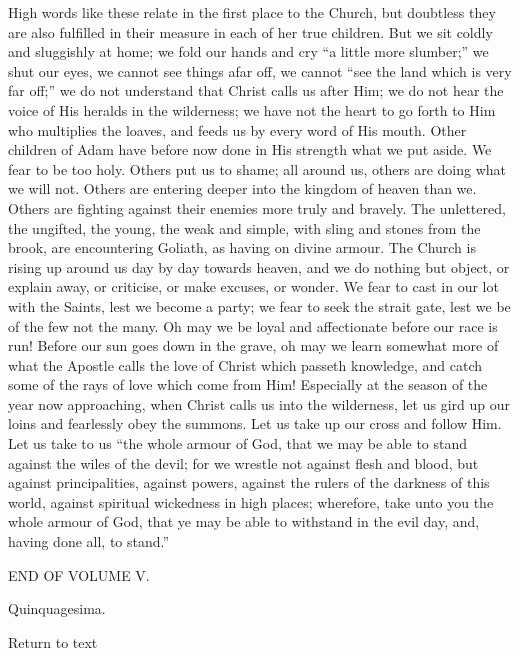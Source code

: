 High words like these relate in the first place to the Church, but
doubtless they are also fulfilled in their measure in each of her true
children. But we sit coldly and sluggishly at home; we fold our hands
and cry ``a little more slumber;'' we shut our eyes, we cannot
see things afar off, we cannot ``see the land which is very far
off;'' we do not understand that Christ calls us after Him; we do
not hear the voice of His heralds in the wilderness; we have not the
heart to go forth to Him who multiplies the loaves, and feeds us by
every word of His mouth. Other children of Adam have before now done
in His strength what we put aside. We fear to be too holy. Others put
us to shame; all around us, others are doing what we will not. Others
are entering deeper into the kingdom of heaven than we. Others are
fighting against their enemies more truly and bravely. The unlettered,
the ungifted, the young, the weak and simple, with sling and stones
from the brook, are encountering Goliath, as having on divine armour.
The Church is rising up around us day by day towards heaven, and we do
nothing but object, or explain away, or criticise, or make excuses, or
wonder. We fear to cast in our lot with the Saints, lest we become a
party; we fear to seek the strait gate, lest we be of the few not the
many. Oh may we be loyal and affectionate before our race is run!
Before our sun goes down in the grave, oh may we learn somewhat more
of what the Apostle calls the love of Christ which passeth knowledge,
and catch some of the rays of love which come from Him! Especially at
the season of the year now approaching, when Christ calls us into the
wilderness, let us gird up our loins and fearlessly obey the summons.
Let us take up our cross and follow Him. Let us take to us ``the
whole armour of God, that we may be able to stand against the wiles of
the devil; for we wrestle not against flesh and blood, but against
principalities, against powers, against the rulers of the darkness of
this world, against spiritual wickedness in high places; wherefore,
take unto you the whole armour of God, that ye may be able to
withstand in the evil day, and, having done all, to stand.''

END OF VOLUME V.


Quinquagesima.

Return to text
